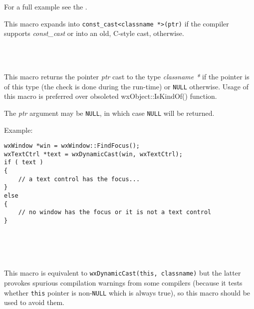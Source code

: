 For a full example see the .


\label{wxconstcast}


This macro expands into {\tt const\_cast<classname *>(ptr)} if the compiler
supports {\it const\_cast} or into an old, C-style cast, otherwise.


\\
\\


\label{wxdynamiccast}


This macro returns the pointer {\it ptr} cast to the type {\it classname *} if
the pointer is of this type (the check is done during the run-time) or
{\tt NULL} otherwise. Usage of this macro is preferred over obsoleted
wxObject::IsKindOf() function.

The {\it ptr} argument may be {\tt NULL}, in which case {\tt NULL} will be
returned.

Example:

\begin{verbatim}
wxWindow *win = wxWindow::FindFocus();
wxTextCtrl *text = wxDynamicCast(win, wxTextCtrl);
if ( text )
{
    // a text control has the focus...
}
else
{
    // no window has the focus or it is not a text control
}
\end{verbatim}


\\
\\
\\


\label{wxdynamiccastthis}


This macro is equivalent to {\tt wxDynamicCast(this, classname)} but the
latter provokes spurious compilation warnings from some compilers (because it
tests whether {\tt this} pointer is non-{\tt NULL} which is always true), so
this macro should be used to avoid them.

